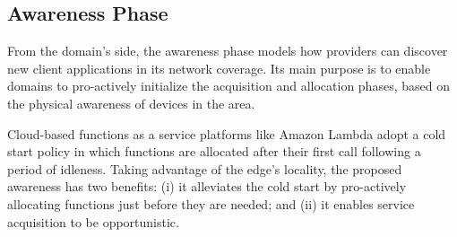 

\subsection*{Awareness Phase}\label{sec:A3-E-awareness}


From the domain's side, the awareness phase models how providers can discover new client applications in its network coverage. Its main purpose is to enable domains to pro-actively initialize the acquisition and allocation phases, based on the physical awareness of devices in the area. 

Cloud-based functions as a service platforms like Amazon Lambda adopt a cold start policy in which functions are allocated after their first call following a period of idleness. Taking advantage of the edge's locality, the proposed awareness has two benefits: (i) it alleviates the cold start by pro-actively allocating functions just before they are needed; and (ii) it enables service acquisition to be opportunistic.


